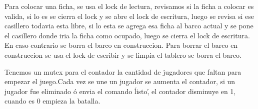 \documentclass[a4paper]{article}
\begin{document}
Para colocar una ficha, se usa el lock de lectura, revisamos si la ficha a
colocar es valida, si lo es se cierra el lock y se abre el lock de escritura,
luego se revisa si ese casillero todavia esta libre, si lo esta se agrega esa
ficha al barco actual y se pone el casillero donde iria la ficha como ocupado,
luego se cierra el lock de escritura. En caso contrario se borra el barco en
construccion.  Para borrar el barco en construccion se usa el lock de escribir y
se limpia el tablero se borra el barco.

Tenemos un mutex para el contador la cantidad de jugadores que faltan para
empezar el juego.Cada vez se une un jugador se aumenta el contador, si un
jugador fue eliminado ó envia el comando \'listo\', el contador disminuye en 1,
cuando  es $0$ empieza la batalla.
\end{document}
